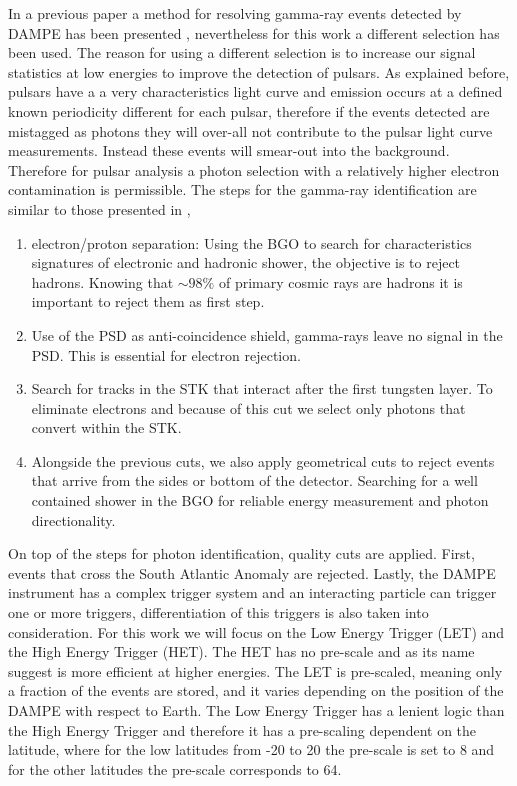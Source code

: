 \documentclass{PoS}
\begin{document}
In a previous paper  a method for resolving gamma-ray events detected by DAMPE has been presented \cite{zunlei}, nevertheless for this work a different selection has been used. The reason for using a different selection is to increase our signal statistics at low energies to improve the detection of pulsars. As explained before, pulsars have a a very characteristics light curve and emission occurs at a defined known periodicity different  for each pulsar, therefore if the events detected are mistagged as photons they will over-all not contribute to the pulsar light curve measurements. Instead these events will smear-out into the background. Therefore for pulsar analysis a photon selection with a relatively higher electron contamination is permissible.
The steps for the gamma-ray identification are similar to those presented in \cite{zunlei},
\begin{enumerate}
	\item electron/proton separation: Using the BGO to search for characteristics signatures of electronic and hadronic shower, the objective is to reject hadrons. Knowing that $\sim 98\%$ of primary cosmic rays are hadrons it is important to reject them as first step.
	\item Use of the PSD as anti-coincidence shield, gamma-rays leave no signal in the PSD. This is essential for electron rejection.
	\item Search for tracks in the STK that interact after the first tungsten layer. To eliminate electrons and because of this cut we select only photons that convert within the STK.
	\item Alongside the previous cuts, we also apply geometrical cuts to reject events that arrive from the sides or bottom of the detector. Searching for a well contained shower in the BGO for reliable energy measurement and photon directionality.

\end{enumerate}

On top of the steps for photon identification, quality cuts are applied. First, events that cross the South Atlantic Anomaly are rejected. Lastly, the DAMPE instrument has a complex trigger system and an interacting particle can trigger one or more triggers, differentiation of this triggers is also taken into consideration. For this work we will focus on the Low Energy Trigger (LET) and the High Energy Trigger (HET). The HET has no pre-scale and as its name suggest is more efficient at higher energies. The LET is pre-scaled, meaning only a fraction of the events are stored,  and it varies depending on the position of the DAMPE with respect to Earth. The Low Energy Trigger has a lenient logic than the High Energy Trigger and therefore it has a pre-scaling dependent on the latitude, where for the low latitudes from -20 to 20 the pre-scale is set to 8 and for the other latitudes the pre-scale corresponds to 64.
\end{document}
